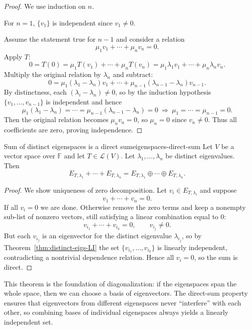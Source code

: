 \begin{proof}
We use induction on $n$.

For $n=1$, $\{v_1\}$ is independent since $v_1\neq 0$.

Assume the statement true for $n-1$ and consider a relation
\[
\mu_1 v_1+\cdots+\mu_n v_n=0.
\]
Apply $T$:
\[
0=T(0)=\mu_1 T(v_1)+\cdots+\mu_n T(v_n)=\mu_1\lambda_1 v_1+\cdots+\mu_n\lambda_n v_n.
\]
Multiply the original relation by $\lambda_n$ and subtract:
\[
0=\mu_1(\lambda_1-\lambda_n)v_1+\cdots+\mu_{n-1}(\lambda_{n-1}-\lambda_n)v_{n-1}.
\]
By distinctness, each $(\lambda_i-\lambda_n)\neq 0$, so by the induction hypothesis $\{v_1,\dots,v_{n-1}\}$ is independent and hence
\[
\mu_1(\lambda_1-\lambda_n)=\cdots=\mu_{n-1}(\lambda_{n-1}-\lambda_n)=0 \ \Longrightarrow\ \mu_1=\cdots=\mu_{n-1}=0.
\]
Then the original relation becomes $\mu_n v_n=0$, so $\mu_n=0$ since $v_n\neq 0$.
Thus all coefficients are zero, proving independence.
\end{proof}

\begin{theorem}{Sum of distinct eigenspaces is a direct sum}{eigenspaces-direct-sum}
Let $V$ be a vector space over $\mathbb{F}$ and let $T\in\mathcal{L}(V)$.
Let $\lambda_1,\dots,\lambda_n$ be distinct eigenvalues. Then
\[
E_{T,\lambda_1}+\cdots+E_{T,\lambda_n}=E_{T,\lambda_1}\oplus\cdots\oplus E_{T,\lambda_n}.
\]
\end{theorem}

\begin{proof}
We show uniqueness of zero decomposition. Let $v_i\in E_{T,\lambda_i}$ and suppose
\[
v_1+\cdots+v_n=0.
\]
If all $v_i=0$ we are done. Otherwise remove the zero terms and keep a nonempty sub-list of nonzero vectors,
still satisfying a linear combination equal to $0$:
\[
v_{i_1}+\cdots+v_{i_k}=0,\qquad v_{i_j}\neq 0.
\]
But each $v_{i_j}$ is an eigenvector for the distinct eigenvalue $\lambda_{i_j}$, so by
Theorem~\ref{thm:distinct-eigs-LI} the set $\{v_{i_1},\dots,v_{i_k}\}$ is linearly independent, contradicting
a nontrivial dependence relation. Hence all $v_i=0$, so the sum is direct.

\end{proof}

This theorem is the foundation of diagonalization: if the eigenspaces span the whole space, then we can choose a basis of eigenvectors.
The direct-sum property ensures that eigenvectors from different eigenspaces never ``interfere'' with each other, so combining bases of individual eigenspaces always yields a linearly independent set.

